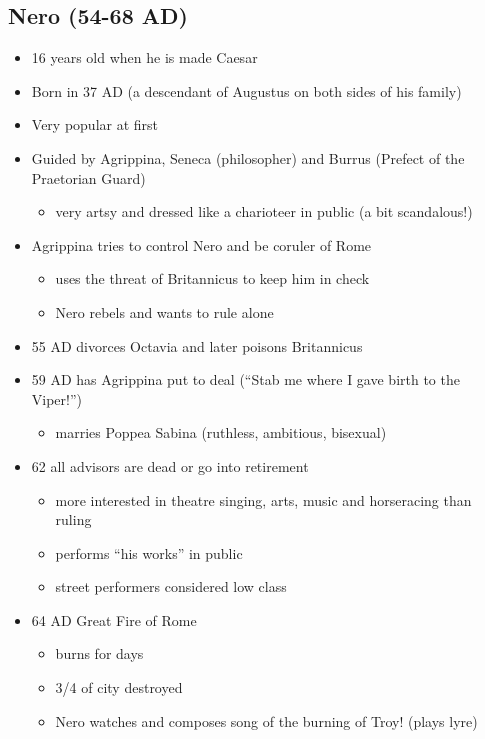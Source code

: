 \documentclass[12pt, twoside]{article}
\begin{document}
\subsection{Nero (54-68 AD)}
\begin{itemize}
\item 16 years old when he is made Caesar
\item Born in 37 AD (a descendant of Augustus on both sides of his family)
\item Very popular at first
\item Guided by Agrippina, Seneca (philosopher) and Burrus (Prefect of the Praetorian Guard)
	\begin{itemize}
	\item very artsy and dressed like a charioteer in public (a bit scandalous!)
	\end{itemize}
\item Agrippina tries to control Nero and be coruler of Rome
	\begin{itemize}
	\item uses the threat of Britannicus to keep him in check
	\item Nero rebels and wants to rule alone
	\end{itemize}
\item 55 AD divorces Octavia and later poisons Britannicus
\item 59 AD has Agrippina put to deal (“Stab me where I gave birth to the Viper!”)
	\begin{itemize}
	\item marries Poppea Sabina (ruthless, ambitious, bisexual)
	\end{itemize}
\item 62 all advisors are dead or go into retirement
	\begin{itemize}
	\item more interested in theatre singing, arts, music and horseracing than ruling
	\item performs “his works” in public
	\item street performers considered low class
	\end{itemize}
\item 64 AD Great Fire of Rome
	\begin{itemize}
	\item burns for days
	\item 3/4 of city destroyed
	\item Nero watches and composes song of the burning of Troy! (plays lyre)
	\end{itemize}

\end{itemize}
\end{document}
